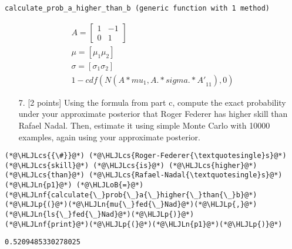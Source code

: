 \documentclass[12pt,a4paper]{article}
\newcommand{\HLJLn}[1]{#1}
\newcommand{\HLJLnf}[1]{\textcolor[RGB]{66,102,213}{#1}}
\newcommand{\HLJLoB}[1]{\textcolor[RGB]{102,102,102}{\textbf{#1}}}
\newcommand{\HLJLp}[1]{#1}
\newcommand{\HLJLcs}[1]{\textcolor[RGB]{153,153,119}{\textit{#1}}}
\begin{document}
\begin{lstlisting}
calculate_prob_a_higher_than_b (generic function with 1 method)
\end{lstlisting}



\begin{align}
A =
\begin{bmatrix}
1 & -1\\
0 & 1
\end{bmatrix}\\
\mu = [\mu_1 \mu_2]\\
\sigma = [\sigma_1 \sigma_2]\\
1 - cdf(N({A * mu}_1, {A .* sigma .* A'}_{11}), 0)
\end{align}
\begin{itemize}
\item[7. ] [2 points] Using the formula from part c, compute the exact probability under your approximate posterior that Roger Federer has higher skill than Rafael Nadal. Then, estimate it using simple Monte Carlo with 10000 examples, again using your approximate posterior.

\end{itemize}

\begin{lstlisting}
(*@\HLJLcs{{\#}}@*) (*@\HLJLcs{Roger-Federer{\textquotesingle}s}@*) (*@\HLJLcs{skill}@*) (*@\HLJLcs{is}@*) (*@\HLJLcs{higher}@*) (*@\HLJLcs{than}@*) (*@\HLJLcs{Rafael-Nadal{\textquotesingle}s}@*)
(*@\HLJLn{p1}@*) (*@\HLJLoB{=}@*) (*@\HLJLnf{calculate{\_}prob{\_}a{\_}higher{\_}than{\_}b}@*)(*@\HLJLp{(}@*)(*@\HLJLn{mu{\_}fed{\_}Nad}@*)(*@\HLJLp{,}@*) (*@\HLJLn{ls{\_}fed{\_}Nad}@*)(*@\HLJLp{)}@*)
(*@\HLJLnf{print}@*)(*@\HLJLp{(}@*)(*@\HLJLn{p1}@*)(*@\HLJLp{)}@*)
\end{lstlisting}

\begin{lstlisting}
0.5209485330278025
\end{lstlisting}
\end{document}
